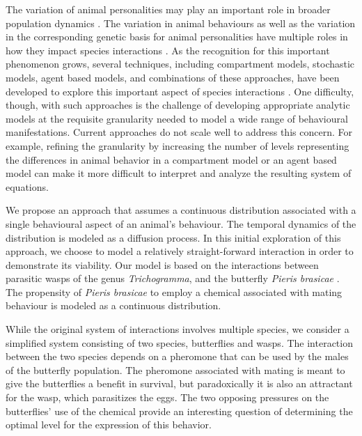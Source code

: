 \documentclass[review,authoryear]{elsarticle}
\begin{document}
The variation of animal personalities may play an important role in broader population dynamics \citep{doi:10.1111/j.1461-0248.2010.01536.x}.  The variation in animal behaviours as well as the variation in the corresponding genetic basis for animal personalities have multiple roles in how they impact species interactions \citep{doi:10.1111/j.1461-0248.2010.01536.x,doi:10.1086/687235,mierzejewski_horn_luong_2019,SANTICCHIA20191,doi:10.1098/rspb.2014.1016,FARINE2015609,sibbald2009individual,kurvers2011effect,modlmeier2012diverse,doi:10.1037/0735-7036.107.3.250}.  As the recognition for this important phenomenon grows, several techniques,  including compartment models, stochastic
models, agent based models, and combinations of these
approaches, have been developed to explore this important aspect of species interactions  \citep{Keeling65,doi:10.1086/687235,doi:10.1098/rspb.2001.1599,SuperspreadingLloyd}.  One difficulty, though, with such approaches is the
challenge of developing appropriate analytic models at the requisite granularity needed to model a wide range of behavioural manifestations. Current approaches do not scale well to address this concern. For example, refining the granularity by increasing the number of levels representing the differences in animal behavior in a compartment model or an agent based model can make it more difficult to interpret and analyze the resulting system of equations. 

We propose an approach that assumes a continuous distribution
associated with a single behavioural aspect of an animal's behaviour. The temporal dynamics of the distribution is modeled as a diffusion process. In
this initial exploration of this approach, we choose to model a relatively
straight-forward interaction in order to demonstrate its viability. Our model is based on
the interactions between parasitic wasps of the genus
\textit{Trichogramma}, and the butterfly \textit{Pieris
  brasicae} \citep{10.1093/beheco/arq007}.  The propensity of
\textit{Pieris brasicae} to employ a chemical associated with mating
behaviour is modeled as a continuous distribution.

While the original system of interactions involves multiple species, we consider a simplified system consisting of two species, butterflies and wasps.  The interaction between the two species depends on a pheromone that can be used by the males of the butterfly population. The pheromone associated with mating is meant to give the butterflies a benefit in survival, but paradoxically it is also an attractant for the wasp, which parasitizes the eggs. The two opposing pressures on the butterflies' use of the chemical provide an interesting question of determining the optimal level for the expression of this behavior.
\end{document}
